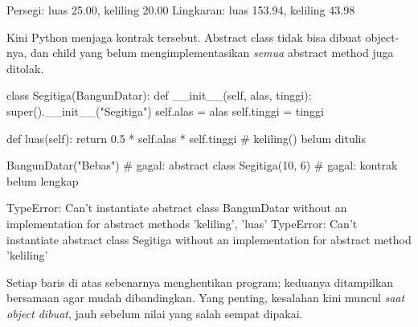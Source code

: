 \begin{keluaran}
Persegi: luas 25.00, keliling 20.00
Lingkaran: luas 153.94, keliling 43.98
\end{keluaran}

Kini Python menjaga kontrak tersebut. Abstract class tidak bisa dibuat object-nya, dan child yang belum mengimplementasikan \emph{semua} abstract method juga ditolak.

\begin{kode}
class Segitiga(BangunDatar):
    def __init__(self, alas, tinggi):
        super().__init__("Segitiga")
        self.alas = alas
        self.tinggi = tinggi

    def luas(self):
        return 0.5 * self.alas * self.tinggi
    # keliling() belum ditulis

BangunDatar("Bebas")     # gagal: abstract class
Segitiga(10, 6)          # gagal: kontrak belum lengkap
\end{kode}

\begin{keluaran}
TypeError: Can't instantiate abstract class BangunDatar without an implementation for abstract methods 'keliling', 'luas'
TypeError: Can't instantiate abstract class Segitiga without an implementation for abstract method 'keliling'
\end{keluaran}

Setiap baris di atas sebenarnya menghentikan program; keduanya ditampilkan bersamaan agar mudah dibandingkan. Yang penting, kesalahan kini muncul \emph{saat object dibuat}, jauh sebelum nilai yang salah sempat dipakai.

